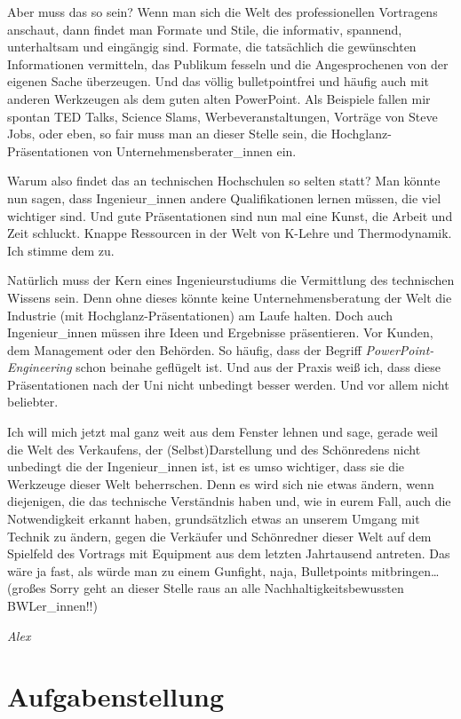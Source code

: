 \documentclass[DIV=15,headinclude=true]{scrreprt}
\begin{document}
Aber muss das so sein? Wenn man sich die Welt des professionellen
Vortragens anschaut, dann findet man Formate und Stile, die informativ,
spannend, unterhaltsam und eingängig sind. Formate, die tatsächlich die
gewünschten Informationen vermitteln, das Publikum fesseln und die
Angesprochenen von der eigenen Sache überzeugen. Und das völlig
bulletpointfrei und häufig auch mit anderen Werkzeugen als dem guten
alten PowerPoint. Als Beispiele fallen mir spontan TED Talks, Science
Slams, Werbeveranstaltungen, Vorträge von Steve Jobs, oder eben, so fair
muss man an dieser Stelle sein, die Hochglanz-Präsentationen von
Unternehmensberater\_innen ein.

Warum also findet das an technischen Hochschulen so selten statt? Man
könnte nun sagen, dass Ingenieur\_innen andere Qualifikationen lernen
müssen, die viel wichtiger sind. Und gute Präsentationen sind nun mal
eine Kunst, die Arbeit und Zeit schluckt. Knappe Ressourcen in der Welt
von K-Lehre und Thermodynamik. Ich stimme dem zu.

Natürlich muss der Kern eines Ingenieurstudiums die Vermittlung des
technischen Wissens sein. Denn ohne dieses könnte keine
Unternehmensberatung der Welt die Industrie (mit
Hochglanz-Präsentationen) am Laufe halten. Doch auch Ingenieur\_innen
müssen ihre Ideen und Ergebnisse präsentieren. Vor Kunden, dem
Management oder den Behörden. So häufig, dass der Begriff
\emph{PowerPoint-Engineering} schon beinahe geflügelt ist. Und aus der
Praxis weiß ich, dass diese Präsentationen nach der Uni nicht unbedingt
besser werden. Und vor allem nicht beliebter.

Ich will mich jetzt mal ganz weit aus dem Fenster lehnen und sage,
gerade weil die Welt des Verkaufens, der (Selbst)Darstellung und des
Schönredens nicht unbedingt die der Ingenieur\_innen ist, ist es umso
wichtiger, dass sie die Werkzeuge dieser Welt beherrschen. Denn es wird
sich nie etwas ändern, wenn diejenigen, die das technische Verständnis
haben und, wie in eurem Fall, auch die Notwendigkeit erkannt haben,
grundsätzlich etwas an unserem Umgang mit Technik zu ändern, gegen die
Verkäufer und Schönredner dieser Welt auf dem Spielfeld des Vortrags mit
Equipment aus dem letzten Jahrtausend antreten. Das wäre ja fast, als
würde man zu einem Gunfight, naja, Bulletpoints mitbringen\ldots{}
(großes Sorry geht an dieser Stelle raus an alle
Nachhaltigkeitsbewussten BWLer\_innen!!)

\emph{Alex}

\section{Aufgabenstellung}
\label{sec:vortragsstil}
\end{document}
